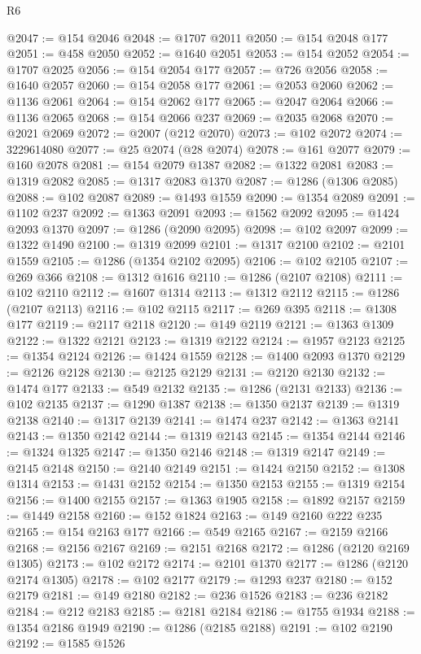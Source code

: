 \begin{lexlean}{R6}
\begin{coremodule}
@2047 := @154 @2046
@2048 := @1707 @2011
@2050 := @154 @2048 @177
@2051 := @458 @2050
@2052 := @1640 @2051
@2053 := @154 @2052
@2054 := @1707 @2025
@2056 := @154 @2054 @177
@2057 := @726 @2056
@2058 := @1640 @2057
@2060 := @154 @2058 @177
@2061 := @2053 @2060
@2062 := @1136 @2061
@2064 := @154 @2062 @177
@2065 := @2047 @2064
@2066 := @1136 @2065
@2068 := @154 @2066 @237
@2069 := @2035 @2068
@2070 := @2021 @2069
@2072 := @2007 (@212 @2070)
@2073 := @102 @2072
@2074 := 3229614080
@2077 := @25 @2074 (@28 @2074)
@2078 := @161 @2077
@2079 := @160 @2078
@2081 := @154 @2079 @1387
@2082 := @1322 @2081
@2083 := @1319 @2082
@2085 := @1317 @2083 @1370
@2087 := @1286 (@1306 @2085)
@2088 := @102 @2087
@2089 := @1493 @1559
@2090 := @1354 @2089
@2091 := @1102 @237
@2092 := @1363 @2091
@2093 := @1562 @2092
@2095 := @1424 @2093 @1370
@2097 := @1286 (@2090 @2095)
@2098 := @102 @2097
@2099 := @1322 @1490
@2100 := @1319 @2099
@2101 := @1317 @2100
@2102 := @2101 @1559
@2105 := @1286 (@1354 @2102 @2095)
@2106 := @102 @2105
@2107 := @269 @366
@2108 := @1312 @1616
@2110 := @1286 (@2107 @2108)
@2111 := @102 @2110
@2112 := @1607 @1314
@2113 := @1312 @2112
@2115 := @1286 (@2107 @2113)
@2116 := @102 @2115
@2117 := @269 @395
@2118 := @1308 @177
@2119 := @2117 @2118
@2120 := @149 @2119
@2121 := @1363 @1309
@2122 := @1322 @2121
@2123 := @1319 @2122
@2124 := @1957 @2123
@2125 := @1354 @2124
@2126 := @1424 @1559
@2128 := @1400 @2093 @1370
@2129 := @2126 @2128
@2130 := @2125 @2129
@2131 := @2120 @2130
@2132 := @1474 @177
@2133 := @549 @2132
@2135 := @1286 (@2131 @2133)
@2136 := @102 @2135
@2137 := @1290 @1387
@2138 := @1350 @2137
@2139 := @1319 @2138
@2140 := @1317 @2139
@2141 := @1474 @237
@2142 := @1363 @2141
@2143 := @1350 @2142
@2144 := @1319 @2143
@2145 := @1354 @2144
@2146 := @1324 @1325
@2147 := @1350 @2146
@2148 := @1319 @2147
@2149 := @2145 @2148
@2150 := @2140 @2149
@2151 := @1424 @2150
@2152 := @1308 @1314
@2153 := @1431 @2152
@2154 := @1350 @2153
@2155 := @1319 @2154
@2156 := @1400 @2155
@2157 := @1363 @1905
@2158 := @1892 @2157
@2159 := @1449 @2158
@2160 := @152 @1824
@2163 := @149 @2160 @222 @235
@2165 := @154 @2163 @177
@2166 := @549 @2165
@2167 := @2159 @2166
@2168 := @2156 @2167
@2169 := @2151 @2168
@2172 := @1286 (@2120 @2169 @1305)
@2173 := @102 @2172
@2174 := @2101 @1370
@2177 := @1286 (@2120 @2174 @1305)
@2178 := @102 @2177
@2179 := @1293 @237
@2180 := @152 @2179
@2181 := @149 @2180
@2182 := @236 @1526
@2183 := @236 @2182
@2184 := @212 @2183
@2185 := @2181 @2184
@2186 := @1755 @1934
@2188 := @1354 @2186 @1949
@2190 := @1286 (@2185 @2188)
@2191 := @102 @2190
@2192 := @1585 @1526

\end{coremodule}
\end{lexlean}
